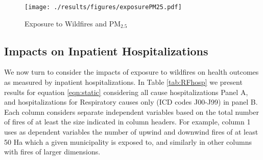 \documentclass[11pt]{article}
\begin{document}
\begin{spacing}{1.5}
\begin{figure}[htpb!]
    \caption{Exposure to Wildfires and PM$_{2.5}$}
    \label{fig:firstStage}
    \centering
    \texttt{[image: ./results/figures/exposurePM25.pdf]}
\end{figure}



\subsection{Impacts on Inpatient Hospitalizations}
\label{scn:results_hosp}
We now turn to consider the impacts of exposure to wildfires on health outcomes as measured by inpatient hospitalizations.  In Table \ref{tab:RFhosp} we present results for equation \ref{eqn:static} considering all cause hospitalizations Panel A, and hospitalizations for Respiratory causes only (ICD codes J00-J99) in panel B.  Each column considers separate independent variables based on the total number of fires of at least the size indicated in column headers.  For example, column 1 uses as dependent variables the number of upwind and downwind fires of at least 50 Ha which a given municipality is exposed to, and similarly in other columns with fires of larger dimensions.


\end{spacing}
\end{document}
